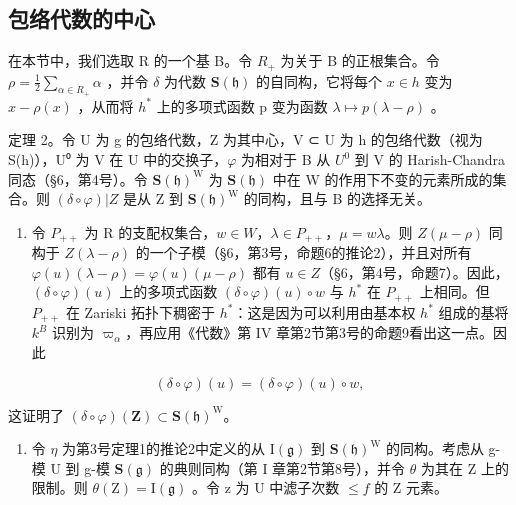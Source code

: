 \subsection{包络代数的中心}

在本节中，我们选取 R 的一个基 B。令 \(R_{+}\) 为关于 B 的正根集合。令 \(\rho = \frac{1}{2} \sum_{\alpha \in R_{+}} \alpha\) ，并令 \(\delta\) 为代数 \(\mathbf{S}(\mathfrak{h})\) 的自同构，它将每个 \(x \in h\) 变为 \(x - \rho(x)\) ，从而将 \(h^{*}\) 上的多项式函数 p 变为函数 \(\lambda \mapsto p(\lambda - \rho)\) 。

定理 2。令 U 为 g 的包络代数，Z 为其中心，V ⊂ U 为 h 的包络代数（视为 S(h)），U⁰ 为 V 在 U 中的交换子，\(\varphi\) 为相对于 B 从 \(U^{0}\) 到 V 的 Harish-Chandra 同态（§6，第4号）。令 \(\mathbf{S}(\mathfrak{h})^{\mathrm{W}}\) 为 \(\mathbf{S}(\mathfrak{h})\) 中在 W 的作用下不变的元素所成的集合。则 \((\delta\circ\varphi)|Z\) 是从 Z 到 \(\mathbf{S}(\mathfrak{h})^{\mathrm{W}}\) 的同构，且与 B 的选择无关。

\begin{enumerate}
\def\labelenumi{\alph{enumi})}
\tightlist
\item
  令 \(P_{++}\) 为 R 的支配权集合，\(w \in W\)，\(\lambda \in P_{++}\)，\(\mu = w\lambda\)。则 \(Z(\mu - \rho)\) 同构于 \(Z(\lambda - \rho)\) 的一个子模（§6，第3号，命题6的推论2），并且对所有 \(\varphi(u)(\lambda - \rho) = \varphi(u)(\mu - \rho)\) 都有 \(u \in Z\)（§6，第4号，命题7）。因此，\((\delta \circ \varphi)(u)\) 上的多项式函数 \((\delta \circ \varphi)(u) \circ w\) 与 \(h^{*}\) 在 \(P_{++}\) 上相同。但 \(P_{++}\) 在 Zariski 拓扑下稠密于 \(h^{*}\)：这是因为可以利用由基本权 \(h^{*}\) 组成的基将 \(k^{B}\) 识别为 \(\varpi_{\alpha}\)，再应用《代数》第 IV 章第2节第3号的命题9看出这一点。因此
\end{enumerate}

\[
(\delta \circ \varphi) (u) = (\delta \circ \varphi) (u) \circ w,
\]

这证明了 \((\delta \circ \varphi)(\mathbf{Z}) \subset \mathbf{S}(\mathfrak{h})^{\mathrm{W}}\)。

\begin{enumerate}
\def\labelenumi{\alph{enumi})}
\setcounter{enumi}{1}
\tightlist
\item
  令 \(\eta\) 为第3号定理1的推论2中定义的从 \(\mathrm{I}(\mathfrak{g})\) 到 \(\mathbf{S}(\mathfrak{h})^{\mathrm{W}}\) 的同构。考虑从 g-模 U 到 g-模 \(\mathbf{S}(\mathfrak{g})\) 的典则同构（第 I 章第2节第8号），并令 \(\theta\) 为其在 Z 上的限制。则 \(\theta(\mathrm{Z}) = \mathrm{I}(\mathfrak{g})\) 。令 z 为 U 中滤子次数 \(\leq f\) 的 Z 元素。
\end{enumerate}

